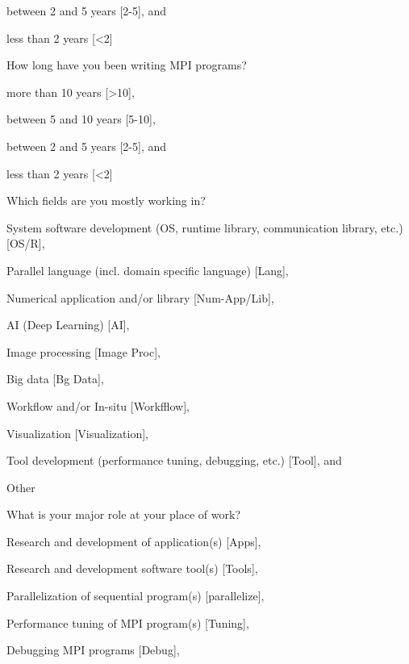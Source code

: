 \documentclass[preprint,5p,times]{elsarticle}
\begin{document}
{{\begin{description}[leftmargin=3mm]
\begin{inparaenum}[{\bf C}1)]
    \item between 2 and 5 years [2-5], and
    \item less than 2 years [\textless 2]
    \end{inparaenum}
  \item[Q6:] How long have you been writing MPI programs?
    \begin{inparaenum}[{\bf C}1)]
    \item more than 10 years [\textgreater10],
    \item between 5 and 10 years [5-10],
    \item between 2 and 5 years [2-5], and
    \item less than 2 years [\textless 2]
    \end{inparaenum}
  \item[Q7*:] Which fields are you mostly working in?
    \begin{inparaenum}[{\bf C}1)]
    \item System software development (OS, runtime library, communication
      library, etc.) [OS/R],
    \item Parallel language (incl. domain specific language) [Lang],
    \item Numerical application and/or library [Num-App/Lib],
    \item AI (Deep Learning) [AI],
    \item Image processing [Image Proc],
    \item Big data [Bg Data],
    \item Workflow and/or In-situ [Workfflow],
    \item Visualization [Visualization],
    \item Tool development (performance tuning, debugging, etc.)
      [Tool], and
    \item Other
    \end{inparaenum}
  \item[Q8*:] What is your major role at your place of work?
    \begin{inparaenum}[{\bf C}1)]
    \item Research and development of application(s) [Apps],
    \item Research and development software tool(s) [Tools],
    \item Parallelization of sequential program(s) [parallelize],
    \item Performance tuning of MPI program(s) [Tuning],
    \item Debugging MPI programs [Debug],

\end{inparaenum}
\end{description}}}
\end{document}
